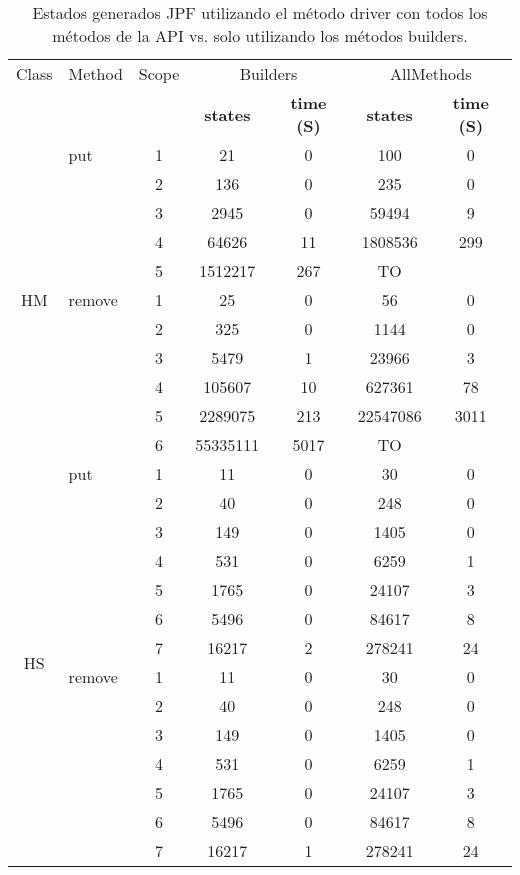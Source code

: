 \begin{table}[H]
\scriptsize
\begin{tabular}{ c| l| c c c c c}
\hline
Class & Method & Scope &
\multicolumn{2}{c}{\textsf{Builders}} &
\multicolumn{2}{c}{\textsf{AllMethods}} \\
&&&
\tiny{\textbf{states}} & \tiny{\textbf{time (S)}} &
\tiny{\textbf{states}} & \tiny{\textbf{time (S)} }\\
\hline
\multirow{11}{*}{HM} 
& put
 & 1 & 21& 0& 100 & 0 \\
& & 2 & 136& 0& 235 & 0 \\
& & 3 & 2945& 0& 59494 & 9 \\
& & 4 & 64626& 11&  1808536& 299 \\
& & 5 & 1512217& 267& TO&  \\

 \cline{2-7}

& remove
 & 1 &25 & 0& 56 & 0 \\
& & 2 &325 & 0& 1144 &  0\\
& & 3 & 5479& 1& 23966 & 3 \\
& & 4 & 105607& 10& 627361 &  78\\
& & 5 & 2289075& 213& 22547086 &3011  \\
& & 6 & 55335111 & 5017&TO &  \\

\hline

\multirow{14}{*}{HS} 
& put
  & 1 & 11  & 0 & 30  & 0 \\
& & 2 & 40  & 0 & 248 & 0 \\
& & 3 & 149 & 0 & 1405  & 0 \\
& & 4 & 531 & 0 & 6259  & 1 \\
& & 5 & 1765  & 0 & 24107 & 3 \\
& & 6 & 5496  & 0 & 84617 & 8 \\
& & 7 & 16217 & 2 & 278241  & 24  \\


\cline{2-7}

& remove
  & 1 & 11  & 0 & 30  & 0 \\
& & 2 & 40  & 0 & 248 & 0 \\
& & 3 & 149 & 0 & 1405  & 0 \\
& & 4 & 531 & 0 & 6259  & 1 \\
& & 5 & 1765  & 0 & 24107 & 3 \\
& & 6 & 5496  & 0 & 84617 & 8 \\
& & 7 & 16217 & 1 & 278241  & 24  \\

\hline

\end{tabular}%
\caption{Estados generados JPF utilizando el método driver con todos los métodos de la API vs. solo utilizando los métodos builders.}
\label{tab:results-jpf2}
 
\end{table}


